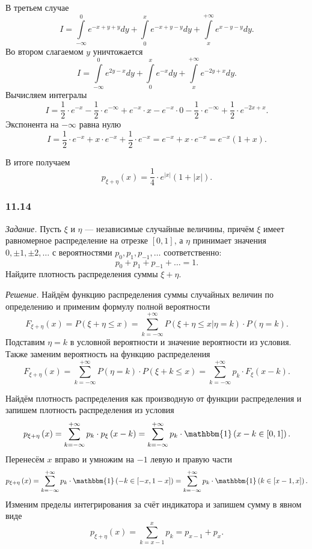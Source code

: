 В третьем случае
$$I =
\int \limits_{- \infty }^0 e^{-x+y+y} dy + \int \limits_0^x e^{-x+y-y} dy + \int \limits_x^{+ \infty } e^{x-y-y} dy.$$
Во втором слагаемом $y$ уничтожается
$$I =
\int \limits_{- \infty }^0 e^{2y-x} dy + \int \limits_0^x e^{-x} dy + \int \limits_x^{+ \infty } e^{-2y+x} dy.$$
Вычисляем интегралы
$$I =
\frac{1}{2} \cdot e^{-x} - \frac{1}{2} \cdot e^{- \infty } + e^{-x} \cdot x - e^{-x} \cdot 0 - \frac{1}{2} \cdot e^{- \infty } + \frac{1}{2} \cdot e^{-2x+x}.$$
Экспонента на $- \infty $ равна нулю
$$I =
\frac{1}{2} \cdot e^{-x} + x \cdot e^{-x} + \frac{1}{2} \cdot e^{-x} =
e^{-x} + x \cdot e^{-x} =
e^{-x} \left( 1+x \right).$$

В итоге получаем
$$p_{ \xi + \eta } \left( x \right) =
\frac{1}{4} \cdot e^{ \left| x \right| } \left( 1 + \left| x \right| \right).$$

\subsubsection*{11.14}

\textit{Задание.}
Пусть $ \xi $ и $ \eta $ --- независимые случайные величины,
причём $ \xi $ имеет равномерное распределение на отрезке $ \left[ 0, 1 \right] $,
а $ \eta $ принимает значения $0, \pm 1, \pm 2, \dotsc $ с вероятностями $p_0, p_1, p_{-1}, \dotsc $ соответственно:
$$p_0 + p_1 + p_{-1} + \dotsc =
1.$$
Найдите плотность распределения суммы $ \xi + \eta $.

\textit{Решение.} Найдём функцию распределения суммы случайных величин по определению и применим формулу полной вероятности
$$F_{ \xi + \eta } \left( x \right) =
P \left( \xi + \eta \leq x \right) =
\sum \limits_{k = - \infty }^{+ \infty } P \left( \left. \xi + \eta \leq x \right| \eta = k \right) \cdot P \left( \eta = k \right).$$
Подставим $ \eta = k$ в условной вероятности и значение вероятности из условия.
Также заменим вероятность на функцию распределения
$$F_{ \xi + \eta } \left( x \right) =
\sum \limits_{k = - \infty }^{+ \infty } P \left( \eta = k \right) \cdot P \left( \xi + k \leq x \right) =
\sum \limits_{k = - \infty }^{+ \infty } p_k \cdot F_{ \xi } \left( x-k \right).$$

Найдём плотность распределения как производную от функции распределения и запишем плотность распределения из условия
$$p_{ \xi + \eta } \left( x \right) =
\sum \limits_{k = - \infty }^{+ \infty } p_k \cdot p_{ \xi } \left( x-k \right) =
\sum \limits_{k = - \infty }^{+ \infty } p_k \cdot \mathbbm{1} \left( x-k \in \left[ 0, 1 \right] \right).$$
Перенесём $x$ вправо и умножим на $-1$ левую и правую части
$$p_{ \xi + \eta } \left( x \right) =
\sum \limits_{k = - \infty }^{+ \infty } p_k \cdot \mathbbm{1} \left( -k \in \left[ -x, 1-x \right] \right) =
\sum \limits_{k = - \infty }^{+ \infty } p_k \cdot \mathbbm{1} \left( k \in \left[ x-1, x \right] \right).$$
Изменим пределы интегрирования за счёт индикатора и запишем сумму в явном виде
$$p_{ \xi + \eta } \left( x \right) =
\sum \limits_{k =x-1}^{x} p_k =
p_{x-1} + p_x.$$

